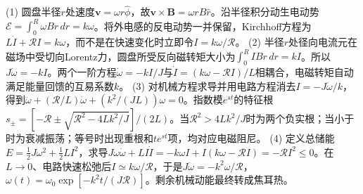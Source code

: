 (1) 圆盘半径\(r\)处速度\(\boldsymbol v=\omega r\hat\phi\)，故\(\boldsymbol v\times\boldsymbol B=\omega rB\hat r\)。沿半径积分动生电动势\(\mathcal E=\int_0^R\omega Br\,dr=k\omega\)。将外电感的反电动势一并保留，Kirchhoff方程为\(L\dot I+\mathcal RI=k\omega\)，而不是在快速变化时立即令\(I=k\omega/\mathcal R\)。
(2) 半径\(r\)处径向电流元在磁场中受切向Lorentz力，圆盘所受反向磁转矩大小为\(\int_0^R IBr\,dr=kI\)。所以\(J\dot\omega=-kI\)。两个一阶方程\(\dot\omega=-kI/J\)与\(\dot I=(k\omega-\mathcal RI)/L\)相耦合，电磁转矩自动满足能量回馈的互易系数\(k\)。
(3) 对机械方程求导并用电路方程消去\(I=-J\dot\omega/k\)，得到\(\ddot\omega+(\mathcal R/L)\dot\omega+(k^2/(JL))\omega=0\)。指数模\(e^{st}\)的特征根\(s_\pm=[-\mathcal R\pm\sqrt{\mathcal R^2-4Lk^2/J}]/(2L)\)。当\(\mathcal R^2>4Lk^2/J\)时为两个负实根；当小于时为衰减振荡；等号时出现重根和\(t e^{st}\)项，均对应电磁阻尼。
(4) 定义总储能\(E=\tfrac12J\omega^2+\tfrac12LI^2\)，求导\(J\omega\dot\omega+LI\dot I=-k\omega I+I(k\omega-\mathcal RI)=-\mathcal RI^2\le0\)。在\(L\to0\)、电路快速松弛后\(I\simeq k\omega/\mathcal R\)，于是\(J\dot\omega=-k^2\omega/\mathcal R\)，\(\omega(t)=\omega_0\exp[-k^2t/(J\mathcal R)]\)。剩余机械动能最终转成焦耳热。

